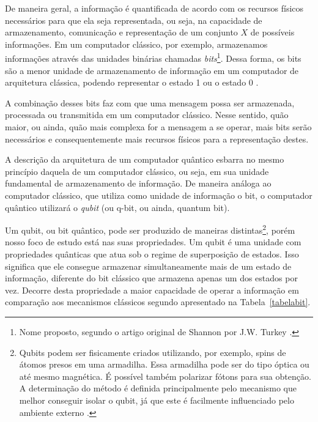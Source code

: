 De maneira geral, a informação é quantificada de acordo com os recursos físicos necessários para que ela seja representada, ou seja, na capacidade de armazenamento, comunicação e representação de um conjunto $X$ de possíveis informações. Em um computador clássico, por exemplo, armazenamos informações através das unidades binárias chamadas \textit{bits}\footnote{Nome proposto, segundo o artigo original de Shannon por J.W. Turkey \cite{MTC}.}. Dessa forma, os bits são a menor unidade de armazenamento de informação em um computador de arquitetura clássica, podendo representar o estado 1 ou o estado 0 \cite{MTC}.

A combinação desses bits faz com que uma mensagem possa ser armazenada, processada ou transmitida em um computador clássico. Nesse sentido, quão maior, ou ainda, quão mais complexa for a mensagem a se operar, mais bits serão necessários e consequentemente mais recursos físicos para a representação destes.

A descrição da arquitetura de um computador quântico esbarra no mesmo princípio daquela de um computador clássico, ou seja, em sua unidade fundamental de armazenamento de informação. De maneira análoga ao computador clássico, que utiliza como unidade de informação o bit, o computador quântico utilizará o \textit{qubit} (ou q-bit, ou ainda, quantum bit).

Um qubit, ou bit quântico, pode ser produzido de maneiras distintas\footnote{Qubits podem ser fisicamente criados utilizando, por exemplo, spins de átomos presos em uma armadilha. Essa armadilha pode ser do tipo óptica ou até mesmo magnética. É possível também polarizar fótons para sua obtenção. A determinação do método é definida principalmente pelo mecanismo que melhor conseguir isolar o qubit, já que este é facilmente influenciado pelo ambiente externo \cite{materialdidaticomecquantica}.}, porém nosso foco de estudo está nas suas propriedades. Um qubit é uma unidade com propriedades quânticas que atua sob o regime de superposição de estados. Isso significa que ele consegue armazenar simultaneamente mais de um estado de informação, diferente do bit clássico que armazena apenas um dos estados por vez. Decorre desta propriedade a maior capacidade de operar a informação em comparação aos mecanismos clássicos segundo apresentado na Tabela~\ref{tabelabit}.

